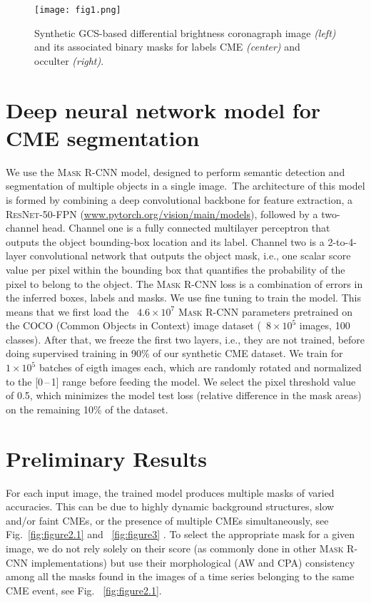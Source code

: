 \documentclass[baaa]{baaa}
\begin{document}
\begin{figure*}
  \centering
  \texttt{[image: fig1.png]}
  \caption{Synthetic GCS-based differential brightness coronagraph image \emph{(left)} and its associated binary masks for labels CME \emph{(center)} and occulter \emph{(right)}.}
  \label{fig:figure1}
\end{figure*}

\section{Deep neural network model for CME segmentation}
We use the \textsc{Mask R-CNN}  \citep{He2017} model, designed to perform semantic detection and segmentation of multiple objects in a single image. The architecture of this model is formed by combining a deep convolutional backbone for feature extraction, a \textsc{ResNet-50-FPN} (\url{www.pytorch.org/vision/main/models}), followed by a two-channel head. Channel one is a fully connected multilayer perceptron that outputs the object bounding-box location and its label. Channel two is a 2-to-4-layer convolutional network that outputs the object mask, i.e., one scalar score value per pixel within the bounding box that quantifies the probability of the pixel to belong to the object. The \textsc{Mask R-CNN} loss is a combination of errors in the inferred boxes, labels and masks.
We use fine tuning to train the model. This means that we first load the ~$4.6\times10^7$ \textsc{Mask R-CNN} parameters pretrained on the COCO (Common Objects in Context) image dataset (~$8\times10^5$ images, 100 classes). After that, we freeze the first two layers, i.e., they are not trained, before doing supervised training in 90\% of our synthetic CME dataset. We train for ~$1\times10^5$ batches of eigth images each, which are randomly rotated and normalized to the [0\,--\,1] range before feeding the model. We select the pixel threshold value of 0.5, which minimizes the model test loss (relative difference in the mask areas) on the remaining 10\% of the dataset.

\section{Preliminary Results}
For each input image, the trained model produces multiple masks of varied accuracies. This can be due to highly dynamic background structures, slow and/or faint CMEs, or the presence of multiple CMEs simultaneously, see Fig.~\ref{fig:figure2.1} and ~\ref{fig:figure3} . To select the appropriate mask for a given image, we do not rely solely on their score (as commonly done in other \textsc{Mask R-CNN} implementations) but use their morphological (AW and CPA) consistency among all the masks found in the images of a time series belonging to the same CME event, see Fig. ~\ref{fig:figure2.1}.
\end{document}
